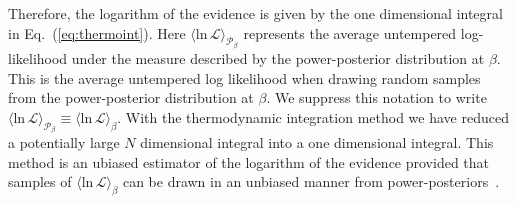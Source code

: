 Therefore, the logarithm of the evidence is given by the one dimensional integral in Eq.~(\ref{eq:thermoint}).
Here $\langle \mathrm{ln} \, \mathcal{L} \rangle_{\mathcal{P}_\beta}$ represents the average untempered log-likelihood under the measure described by the power-posterior distribution at $\beta$. This is the average untempered log likelihood when drawing random samples from the power-posterior distribution at $\beta$. We suppress this notation to write $\langle \mathrm{ln} \, \mathcal{L} \rangle_{\mathcal{P}_\beta} \equiv \langle \mathrm{ln} \, \mathcal{L} \rangle_\beta$. With the thermodynamic integration method we have reduced a potentially large $N$ dimensional integral into a one dimensional integral. This method is an ubiased estimator of the logarithm of the evidence provided that samples of $\langle \mathrm{ln} \, \mathcal{L} \rangle_\beta$ can be drawn in an unbiased manner from power-posteriors~\citep{carlson2016partition}.

